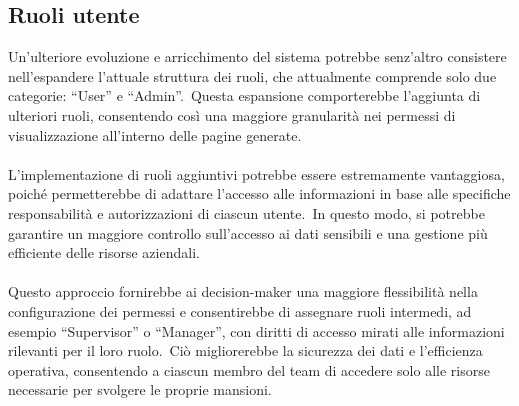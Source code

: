 \subsection{Ruoli utente}\label{sec:cap_sec_subsec}
Un'ulteriore evoluzione e arricchimento del sistema potrebbe senz'altro consistere nell'espandere 
l'attuale struttura dei ruoli, che attualmente comprende solo due categorie: ``User'' e ``Admin''.\ 
Questa espansione comporterebbe l'aggiunta di ulteriori ruoli, consentendo così una maggiore granularità nei 
permessi di visualizzazione all'interno delle pagine generate.
\\ \\  
L'implementazione di ruoli aggiuntivi potrebbe essere estremamente vantaggiosa, poiché permetterebbe di adattare 
l'accesso alle informazioni in base alle specifiche responsabilità e autorizzazioni di ciascun utente.\ 
In questo modo, si potrebbe garantire un maggiore controllo sull'accesso ai dati sensibili e una gestione 
più efficiente delle risorse aziendali.
\\ \\
Questo approccio fornirebbe ai decision-maker una maggiore flessibilità nella configurazione dei permessi e consentirebbe 
di assegnare ruoli intermedi, ad esempio ``Supervisor'' o ``Manager'', con diritti di accesso mirati alle informazioni rilevanti 
per il loro ruolo.\ Ciò migliorerebbe la sicurezza dei dati e l'efficienza operativa, 
consentendo a ciascun membro del team di accedere solo alle risorse necessarie per svolgere le proprie mansioni.
%

